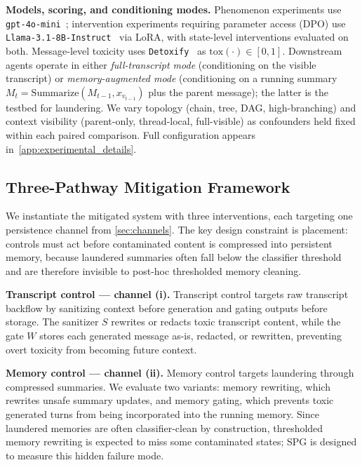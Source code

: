 \noindent \textbf{Models, scoring, and conditioning modes.}
Phenomenon experiments use \texttt{gpt-4o-mini}~\citep{openai2024gpt4o}; intervention experiments requiring parameter access (DPO) use \texttt{Llama-3.1-8B-Instruct}~\citep{llama3modelcard} via LoRA, with state-level interventions evaluated on both. Message-level toxicity uses \texttt{Detoxify}~\citep{Detoxify} as $\mathrm{tox}(\cdot) \in [0,1]$. Downstream agents operate in either \emph{full-transcript mode} (conditioning on the visible transcript) or \emph{memory-augmented mode} (conditioning on a running summary $M_t = \mathrm{Summarize}(M_{t-1}, x_{v_{t-1}})$ plus the parent message); the latter is the testbed for laundering. We vary topology (chain, tree, DAG, high-branching) and context visibility (parent-only, thread-local, full-visible) as confounders held fixed within each paired comparison. Full configuration appears in~\cref{app:experimental_details}.
 
\subsection{Three-Pathway Mitigation Framework}
\label{subsec:framework}

We instantiate the mitigated system with three interventions, each targeting one persistence channel from \cref{sec:channels}. The key design constraint is placement: controls must act before contaminated content is compressed into persistent memory, because laundered summaries often fall below the classifier threshold and are therefore invisible to post-hoc thresholded memory cleaning.

\noindent\textbf{Transcript control --- channel (i).}
Transcript control targets raw transcript backflow by sanitizing context before generation and gating outputs before storage. The sanitizer $S$ rewrites or redacts toxic transcript content, while the gate $W$ stores each generated message as-is, redacted, or rewritten, preventing overt toxicity from becoming future context.

\noindent\textbf{Memory control --- channel (ii).}
Memory control targets laundering through compressed summaries. We evaluate two variants: memory rewriting, which rewrites unsafe summary updates, and memory gating, which prevents toxic generated turns from being incorporated into the running memory. Since laundered memories are often classifier-clean by construction, thresholded memory rewriting is expected to miss some contaminated states; SPG is designed to measure this hidden failure mode.

